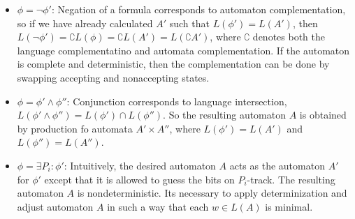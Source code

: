 \documentclass[pdflatex,sn-mathphys-num]{sn-jnl}%
\theoremstyle{thmstyleone}%
\theoremstyle{thmstyletwo}%
\theoremstyle{thmstylethree}%
\begin{document}
\begin{itemize}
\begin{figure}[H]
                    \end{figure}
                \item $\phi = \neg \phi'$: Negation of a formula corresponds to automaton complementation, so if we have already calculated $A'$ such that $L(\phi') = L(A')$, then $L(\neg \phi') = \complement L(\phi) = \complement L(A') = L(\complement A')$, where $\complement$ denotes both the language complementatino and automata complementation. If the automaton is complete and deterministic, then the complementation can be done by swapping accepting and nonaccepting states.
                \vspace*{0.5em}
                \item $\phi = \phi' \land \phi''$: Conjunction corresponds to language intersection, $L(\phi' \land \phi'') = L(\phi') \cap L(\phi'')$. So the resulting automaton $A$ is obtained by production fo automata $A' \times A''$, where $L(\phi') = L(A')$ and $L(\phi'') = L(A'')$.
                \vspace*{0.5em}
                \item $\phi = \exists P_i : \phi'$: Intuitively, the desired automaton $A$ acts as the automaton $A'$ for $\phi'$ except that it is allowed to guess the bits on $P_i$-track. The resulting automaton $A$ is nondeterministic. Its necessary to apply determinization and adjust automaton $A$ in such a way that each $w \in L(A)$ is minimal.
            \end{itemize}
\end{document}
